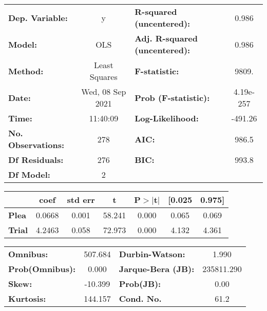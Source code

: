 \begin{center}
\begin{tabular}{lclc}
\toprule
\textbf{Dep. Variable:}    &        y         & \textbf{  R-squared (uncentered):}      &     0.986   \\
\textbf{Model:}            &       OLS        & \textbf{  Adj. R-squared (uncentered):} &     0.986   \\
\textbf{Method:}           &  Least Squares   & \textbf{  F-statistic:       }          &     9809.   \\
\textbf{Date:}             & Wed, 08 Sep 2021 & \textbf{  Prob (F-statistic):}          & 4.19e-257   \\
\textbf{Time:}             &     11:40:09     & \textbf{  Log-Likelihood:    }          &   -491.26   \\
\textbf{No. Observations:} &         278      & \textbf{  AIC:               }          &     986.5   \\
\textbf{Df Residuals:}     &         276      & \textbf{  BIC:               }          &     993.8   \\
\textbf{Df Model:}         &           2      & \textbf{                     }          &             \\
\bottomrule
\end{tabular}
\begin{tabular}{lcccccc}
               & \textbf{coef} & \textbf{std err} & \textbf{t} & \textbf{P$> |$t$|$} & \textbf{[0.025} & \textbf{0.975]}  \\
\midrule
\textbf{Plea}  &       0.0668  &        0.001     &    58.241  &         0.000        &        0.065    &        0.069     \\
\textbf{Trial} &       4.2463  &        0.058     &    72.973  &         0.000        &        4.132    &        4.361     \\
\bottomrule
\end{tabular}
\begin{tabular}{lclc}
\textbf{Omnibus:}       & 507.684 & \textbf{  Durbin-Watson:     } &     1.990   \\
\textbf{Prob(Omnibus):} &   0.000 & \textbf{  Jarque-Bera (JB):  } & 235811.290  \\
\textbf{Skew:}          & -10.399 & \textbf{  Prob(JB):          } &      0.00   \\
\textbf{Kurtosis:}      & 144.157 & \textbf{  Cond. No.          } &      61.2   \\
\bottomrule
\end{tabular}
\end{center}
